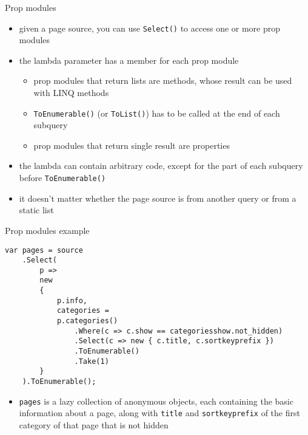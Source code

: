 \documentclass{beamer}
\begin{document}
\begin{frame}{Prop modules}
\begin{itemize}
\item given a page source, you can use \lstinline{Select()} to access one or more prop modules
\item the lambda parameter has a member for each prop module
\begin{itemize}
\item prop modules that return lists are methods, whose result can be used with LINQ methods
\item \lstinline{ToEnumerable()} (or \lstinline{ToList()}) has to be called at the end of each subquery
\item prop modules that return single result are properties
\end{itemize}
\item the lambda can contain arbitrary code, except for the part of each subquery before \lstinline{ToEnumerable()}
\item it doesn't matter whether the page source is from another query or from a static list
\end{itemize}
\end{frame}

\begin{frame}[fragile]{Prop modules example}

\begin{adjustbox}{width=\textwidth,keepaspectratio}
\begin{lstlisting}
var pages = source
    .Select(
        p =>
        new
        {
            p.info,
            categories =
            p.categories()
                .Where(c => c.show == categoriesshow.not_hidden)
                .Select(c => new { c.title, c.sortkeyprefix })
                .ToEnumerable()
                .Take(1)
        }
    ).ToEnumerable();
\end{lstlisting}
\end{adjustbox}
\begin{itemize}
\item \lstinline{pages} is a lazy collection of anonymous objects, each containing the basic information about a page, along with \lstinline{title} and \lstinline{sortkeyprefix} of the first category of that page that is not hidden
\end{itemize}
\end{frame}
\end{document}
